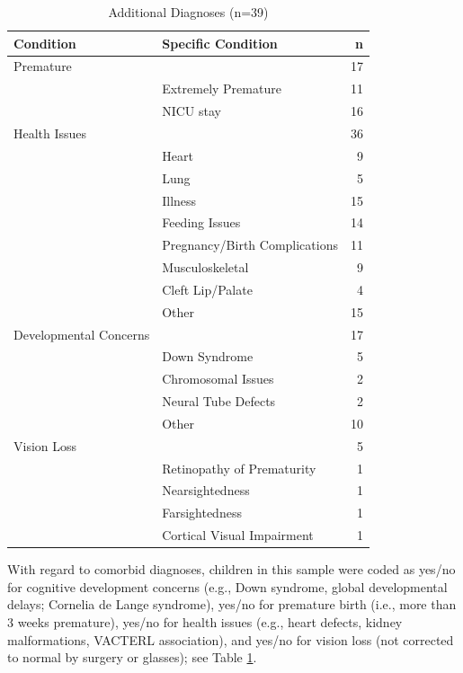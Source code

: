 \documentclass[english,man]{apa6}
\begin{document}
\begin{longtable}[t]{l|l|r}
\caption{\label{tab:comorbid-info}Additional Diagnoses (n=39)}\\
\hline
Condition & Specific Condition & n\\
\hline
Premature &  & 17\\
\hline
 & Extremely Premature & 11\\
\hline
 & NICU stay & 16\\
\hline
Health Issues &  & 36\\
\hline
 & Heart & 9\\
\hline
 & Lung & 5\\
\hline
 & Illness & 15\\
\hline
 & Feeding Issues & 14\\
\hline
 & Pregnancy/Birth Complications & 11\\
\hline
 & Musculoskeletal & 9\\
\hline
 & Cleft Lip/Palate & 4\\
\hline
 & Other & 15\\
\hline
Developmental Concerns &  & 17\\
\hline
 & Down Syndrome & 5\\
\hline
 & Chromosomal Issues & 2\\
\hline
 & Neural Tube Defects & 2\\
\hline
 & Other & 10\\
\hline
Vision Loss &  & 5\\
\hline
 & Retinopathy of Prematurity & 1\\
\hline
 & Nearsightedness & 1\\
\hline
 & Farsightedness & 1\\
\hline
 & Cortical Visual Impairment & 1\\
\hline
\end{longtable}

With regard to comorbid diagnoses, children in this sample were coded as yes/no for cognitive development concerns (e.g., Down syndrome, global developmental delays; Cornelia de Lange syndrome), yes/no for premature birth (i.e., more than 3 weeks premature), yes/no for health issues (e.g., heart defects, kidney malformations, VACTERL association), and yes/no for vision loss (not corrected to normal by surgery or glasses); see Table \ref{tab:comorbid-info}.
\end{document}
